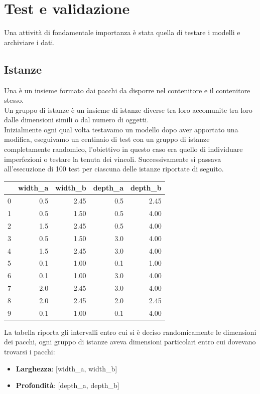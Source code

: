 
\hypertarget{(chap:inquadramento)}{}
\chapter{Test e validazione}
Una attività di fondamentale importanza è stata quella di testare i modelli e archiviare i dati.
\section{Istanze}
Una  è un insieme formato dai pacchi da disporre nel contenitore e il contenitore stesso.\\
Un gruppo di istanze è un insieme di istanze diverse tra loro accomunite tra loro dalle dimensioni simili o dal numero di oggetti.\\
Inizialmente ogni qual volta testavamo un modello dopo aver apportato una modifica, eseguivamo un centinaio di test con un gruppo di istanze completamente randomico, l'obiettivo in questo caso era quello di individuare imperfezioni o testare la tenuta dei vincoli.
Successivamente si passava all'esecuzione di 100 test per ciascuna delle istanze riportate di seguito.
\begin{center}
	\begin{tabular}{lrrrr}
		\toprule
		{} & width\_a & width\_b & depth\_a & depth\_b \\
		\midrule
		0  & 0.5      & 2.45     & 0.5      & 2.45     \\
		1  & 0.5      & 1.50     & 0.5      & 4.00     \\
		2  & 1.5      & 2.45     & 0.5      & 4.00     \\
		3  & 0.5      & 1.50     & 3.0      & 4.00     \\
		4  & 1.5      & 2.45     & 3.0      & 4.00     \\
		5  & 0.1      & 1.00     & 0.1      & 1.00     \\
		6  & 0.1      & 1.00     & 3.0      & 4.00     \\
		7  & 2.0      & 2.45     & 3.0      & 4.00     \\
		8  & 2.0      & 2.45     & 2.0      & 2.45     \\
		9  & 0.1      & 1.00     & 0.1      & 4.00     \\
		\bottomrule
	\end{tabular}
\end{center}
La tabella riporta gli intervalli entro cui si è deciso randomicamente le dimensioni dei pacchi, ogni gruppo di istanze aveva dimensioni particolari entro cui dovevano trovarsi i pacchi:
\begin{itemize}
	\item \textbf{Larghezza}: [width\_a, width\_b]
	\item \textbf{Profondità}: [depth\_a, depth\_b]
\end{itemize}
